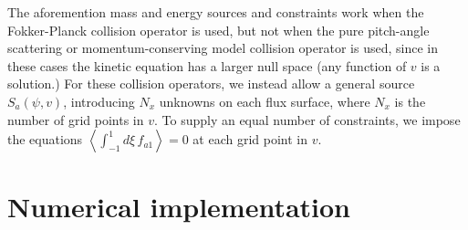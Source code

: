 \documentclass[12pt,superscriptaddress]{revtex4}
\begin{document}
The aforemention mass and energy sources and constraints work when the Fokker-Planck collision operator
is used, 
but not when the pure pitch-angle scattering or momentum-conserving model collision operator is used, since in these cases the kinetic equation has a larger null space
(any function of $v$ is a solution.)
For these collision operators, we instead allow a general source $S_a(\psi,v)$,
introducing $N_x$ unknowns on each flux surface, where $N_x$ is the number of grid points in $v$.
To supply an equal number of constraints, we impose the equations $\left< \int_{-1}^1 d\xi\, f_{a1}\right>=0$
at each grid point in $v$.

\section{Numerical implementation}
\label{sec:numerics}
\end{document}
